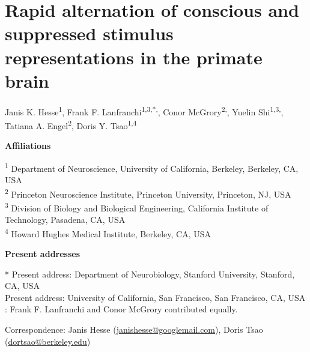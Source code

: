 \documentclass{article}
\begin{document}
\section*{Rapid alternation of conscious and suppressed stimulus representations in the primate brain}

\noindent Janis K. Hesse\textsuperscript{1}, Frank F. Lanfranchi\textsuperscript{1,3,*,\ddag}, Conor McGrory\textsuperscript{2,\ddag}, Yuelin Shi\textsuperscript{1,3,\dag}, Tatiana A. Engel\textsuperscript{2}, Doris Y. Tsao\textsuperscript{1,4}


\textbf{Affiliations}

\textsuperscript{1} Department of Neuroscience, University of California, Berkeley, Berkeley, CA, USA\\
\textsuperscript{2} Princeton Neuroscience Institute, Princeton University, Princeton, NJ, USA\\
\textsuperscript{3} Division of Biology and Biological Engineering, California Institute of Technology, Pasadena, CA, USA\\
\textsuperscript{4} Howard Hughes Medical Institute, Berkeley, CA, USA

\textbf{Present addresses}

* Present address: Department of Neurobiology, Stanford University, Stanford, CA, USA\\
\dag{} Present address: University of California, San Francisco, San Francisco, CA, USA\\
\ddag: Frank F. Lanfranchi and Conor McGrory contributed equally.

Correspondence: Janis Hesse (\href{mailto:janishesse@googlemail.com}{janishesse@googlemail.com}), Doris Tsao (\href{mailto:dortsao@berkeley.edu}{dortsao@berkeley.edu})
\end{document}
